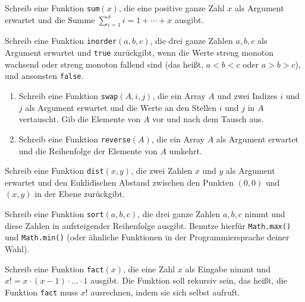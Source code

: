 \documentclass{uebung_cs}
\begin{document}
\begin{aufgabe}[Summe]
    Schreib eine Funktion \texttt{sum}$(x)$, die eine positive ganze Zahl $x$ als Argument erwartet und die Summe $\sum_{i=1}^x i = 1+\cdots+x$ ausgibt.
\end{aufgabe}

\begin{aufgabe}
    Schreib eine Funktion \texttt{inorder}$(a,b,c)$, die drei ganze Zahlen $a,b,c$ als Argument erwartet und \texttt{true} zurückgibt, wenn die Werte streng monoton wachsend oder streng monoton fallend sind (das heißt, $a<b<c$ oder $a>b>c$), und ansonsten \texttt{false}.
\end{aufgabe}

\begin{aufgabe}\mbox{}
    \begin{enumerate}
        \item Schreib eine Funktion \texttt{swap}$(A,i,j)$, die ein Array $A$ und zwei Indizes $i$ und $j$ als Argument erwartet und die Werte an den Stellen $i$ und $j$ in $A$ vertauscht. Gib die Elemente von $A$ vor und nach dem Tausch aus.
        \item Schreib eine Funktion \texttt{reverse}$(A)$, die ein Array $A$ als Argument erwartet und die Reihenfolge der Elemente von $A$ umkehrt.
    \end{enumerate}
\end{aufgabe}

\begin{aufgabe}[Abstand]
    Schreib eine Funktion \texttt{dist}$(x,y)$, die zwei Zahlen $x$ und $y$ als Argument erwartet und den Euklidischen Abstand zwischen den Punkten $(0,0)$ und $(x,y)$ in der Ebene zurückgibt.
\end{aufgabe}

\begin{aufgabe}
    Schreib eine Funktion \texttt{sort}$(a,b,c)$, die drei ganze Zahlen $a,b,c$ nimmt und diese Zahlen in aufsteigender Reihenfolge ausgibt. Benutze hierfür \texttt{Math.max()} und \texttt{Math.min()} (oder ähnliche Funktionen in der Programmiersprache deiner Wahl).
\end{aufgabe}

\begin{aufgabe}[Fakultät]
    Schreib eine Funktion \texttt{fact}$(x)$, die eine Zahl $x$ als Eingabe nimmt und $x!=x\cdot (x-1)\cdot\ldots\cdot 1$ ausgibt.
    Die Funktion soll rekursiv sein, das heißt, die Funktion \texttt{fact} muss $x!$ ausrechnen, indem sie sich selbst aufruft.
\end{aufgabe}
\end{document}
